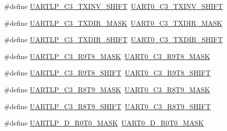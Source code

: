 \begin{DoxyCompactItemize}
\item 
\#define \hyperlink{group___backward___compatibility___symbols_gac43e73179815a02e03de14d95c1d29f0}{U\+A\+R\+T\+L\+P\+\_\+\+C3\+\_\+\+T\+X\+I\+N\+V\+\_\+\+S\+H\+I\+FT}~\hyperlink{group___u_a_r_t0___register___masks_ga7866d64fd9c0f5acb07399d3d575902f}{U\+A\+R\+T0\+\_\+\+C3\+\_\+\+T\+X\+I\+N\+V\+\_\+\+S\+H\+I\+FT}
\item 
\#define \hyperlink{group___backward___compatibility___symbols_ga95dff3853a66ebeee996b014536f86bf}{U\+A\+R\+T\+L\+P\+\_\+\+C3\+\_\+\+T\+X\+D\+I\+R\+\_\+\+M\+A\+SK}~\hyperlink{group___u_a_r_t0___register___masks_gae1d9928e86dff5aff4ba866ce4c26476}{U\+A\+R\+T0\+\_\+\+C3\+\_\+\+T\+X\+D\+I\+R\+\_\+\+M\+A\+SK}
\item 
\#define \hyperlink{group___backward___compatibility___symbols_gacb749efddf2ff0881a30fa3b0b0fd6ec}{U\+A\+R\+T\+L\+P\+\_\+\+C3\+\_\+\+T\+X\+D\+I\+R\+\_\+\+S\+H\+I\+FT}~\hyperlink{group___u_a_r_t0___register___masks_ga8fd1bcbe36bf2b15e1f5bcd945271fd5}{U\+A\+R\+T0\+\_\+\+C3\+\_\+\+T\+X\+D\+I\+R\+\_\+\+S\+H\+I\+FT}
\item 
\#define \hyperlink{group___backward___compatibility___symbols_gaad5e79813f247fac083e627e4125a1b0}{U\+A\+R\+T\+L\+P\+\_\+\+C3\+\_\+\+R9\+T8\+\_\+\+M\+A\+SK}~\hyperlink{group___u_a_r_t0___register___masks_gafa2d2629bdfbedfd82f87d7abe60ef25}{U\+A\+R\+T0\+\_\+\+C3\+\_\+\+R9\+T8\+\_\+\+M\+A\+SK}
\item 
\#define \hyperlink{group___backward___compatibility___symbols_gaaffea46f675353dc12aa3b19a9da33b0}{U\+A\+R\+T\+L\+P\+\_\+\+C3\+\_\+\+R9\+T8\+\_\+\+S\+H\+I\+FT}~\hyperlink{group___u_a_r_t0___register___masks_gac12f14417be540ea9b0a593ff16ab0cc}{U\+A\+R\+T0\+\_\+\+C3\+\_\+\+R9\+T8\+\_\+\+S\+H\+I\+FT}
\item 
\#define \hyperlink{group___backward___compatibility___symbols_gabe3e5842a9d28fcc4699ab569b79d2d6}{U\+A\+R\+T\+L\+P\+\_\+\+C3\+\_\+\+R8\+T9\+\_\+\+M\+A\+SK}~\hyperlink{group___u_a_r_t0___register___masks_ga97ddd31ea21c76d2e25425f34a5ceeae}{U\+A\+R\+T0\+\_\+\+C3\+\_\+\+R8\+T9\+\_\+\+M\+A\+SK}
\item 
\#define \hyperlink{group___backward___compatibility___symbols_gadd1520225db488c74cb9f850c1bf1e99}{U\+A\+R\+T\+L\+P\+\_\+\+C3\+\_\+\+R8\+T9\+\_\+\+S\+H\+I\+FT}~\hyperlink{group___u_a_r_t0___register___masks_ga18a7c7bb418d9b5cf9149d7feb365da3}{U\+A\+R\+T0\+\_\+\+C3\+\_\+\+R8\+T9\+\_\+\+S\+H\+I\+FT}
\item 
\#define \hyperlink{group___backward___compatibility___symbols_ga6c0de61b1bd7ca4438ffc57fe10550ef}{U\+A\+R\+T\+L\+P\+\_\+\+D\+\_\+\+R0\+T0\+\_\+\+M\+A\+SK}~\hyperlink{group___u_a_r_t0___register___masks_gafb52d25fd02d9e7f20c4e2c15b1b4582}{U\+A\+R\+T0\+\_\+\+D\+\_\+\+R0\+T0\+\_\+\+M\+A\+SK}

\end{DoxyCompactItemize}
